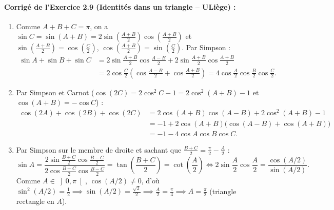 \paragraph{Corrigé de l'Exercice 2.9 (Identités dans un triangle -- ULiège) :}
\begin{enumerate}[label=(\alph*)]
    \item Comme $A+B+C = \pi$, on a $\sin C = \sin(A+B) = 2\sin\left(\frac{A+B}{2}\right)\cos\left(\frac{A+B}{2}\right)$ et $\sin\left(\frac{A+B}{2}\right) = \cos\left(\frac{C}{2}\right)$, $\cos\left(\frac{A+B}{2}\right) = \sin\left(\frac{C}{2}\right)$. Par Simpson :
    \begin{align*}
        \sin A + \sin B + \sin C &= 2\sin\frac{A+B}{2}\cos\frac{A-B}{2} + 2\sin\frac{A+B}{2}\cos\frac{A+B}{2} \\
        &= 2\cos\frac{C}{2}\left(\cos\frac{A-B}{2} + \cos\frac{A+B}{2}\right) = 4\cos\frac{A}{2}\cos\frac{B}{2}\cos\frac{C}{2}.
    \end{align*}
    \item Par Simpson et Carnot ($\cos(2C) = 2\cos^2 C - 1 = 2\cos^2(A+B) - 1$ et $\cos(A+B) = -\cos C$) :
    \begin{align*}
        \cos(2A) + \cos(2B) + \cos(2C) &= 2\cos(A+B)\cos(A-B) + 2\cos^2(A+B) - 1 \\
        &= -1 + 2\cos(A+B)\bigl(\cos(A-B) + \cos(A+B)\bigr) \\
        &= -1 - 4\cos A\cos B\cos C.
    \end{align*}
    \item Par Simpson sur le membre de droite et sachant que $\frac{B+C}{2} = \frac{\pi}{2} - \frac{A}{2}$ :
    \[
        \sin A = \frac{2\sin\frac{B+C}{2}\cos\frac{B-C}{2}}{2\cos\frac{B+C}{2}\cos\frac{B-C}{2}} = \tan\left(\frac{B+C}{2}\right) = \cot\left(\frac{A}{2}\right) \iff 2\sin\frac{A}{2}\cos\frac{A}{2} = \frac{\cos(A/2)}{\sin(A/2)}.
    \]
    Comme $A \in \left]0, \pi\right[$, $\cos(A/2) \neq 0$, d'où $\sin^2(A/2) = \frac{1}{2} \implies \sin(A/2) = \frac{\sqrt{2}}{2} \implies \frac{A}{2} = \frac{\pi}{4} \implies \boxed{A = \frac{\pi}{2}}$ (triangle rectangle en $A$).
\end{enumerate}

